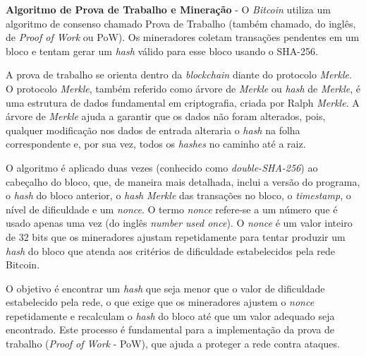 \documentclass[article,12pt,oneside,a4paper,english,brazil]{unifil}
\begin{document}
\begin{Spacing}{1.5}
\textbf{Algoritmo de Prova de Trabalho e Mineração} - O \textit{Bitcoin} utiliza um algoritmo de consenso chamado Prova de Trabalho (também chamado, do inglês, de \textit{Proof of Work} ou PoW). Os mineradores coletam transações pendentes em um bloco e tentam gerar um \textit{hash} válido para esse bloco usando o SHA-256.

A prova de trabalho se orienta dentro da \textit{blockchain} diante do protocolo \textit{Merkle}. O protocolo \textit{Merkle}, também referido como árvore de \textit{Merkle} ou \textit{hash} de \textit{Merkle}, é uma estrutura de dados fundamental em criptografia, criada por Ralph \textit{Merkle}. A árvore de \textit{Merkle} ajuda a garantir que os dados não foram alterados, pois, qualquer modificação nos dados de entrada alteraria o \textit{hash} na folha correspondente e, por sua vez, todos os \textit{hashes} no caminho até a raiz.

O algoritmo é aplicado duas vezes (conhecido como \textit{double-SHA-256}) ao cabeçalho do bloco, que, de maneira mais detalhada, inclui a versão do programa, o \textit{hash} do bloco anterior, o \textit{hash} \textit{Merkle} das transações no bloco, o \textit{timestamp}, o nível de dificuldade e um \textit{nonce}. O termo \textit{nonce} refere-se a um número que é usado apenas uma vez (do inglês \textit{number used once}). O \textit{nonce} é um valor inteiro de 32 bits que os mineradores ajustam repetidamente para tentar produzir um \textit{hash} do bloco que atenda aos critérios de dificuldade estabelecidos pela rede Bitcoin.

O objetivo é encontrar um \textit{hash} que seja menor que o valor de dificuldade estabelecido pela rede, o que exige que os mineradores ajustem o \textit{nonce} repetidamente e recalculam o \textit{hash} do bloco até que um valor adequado seja encontrado. Este processo é fundamental para a implementação da prova de trabalho (\textit{Proof of Work} - PoW), que ajuda a proteger a rede contra ataques.




\end{Spacing}
\end{document}
